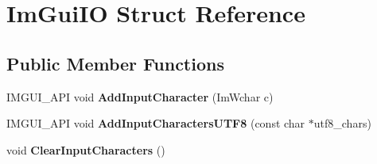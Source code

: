 \hypertarget{struct_im_gui_i_o}{}\section{Im\+Gui\+IO Struct Reference}
\label{struct_im_gui_i_o}
\subsection*{Public Member Functions}
\begin{DoxyCompactItemize}
\item 
\mbox{\label{struct_im_gui_i_o_a52b6bdef9278de5ae2031311a269cf14}} 
I\+M\+G\+U\+I\+\_\+\+A\+PI void {\bfseries Add\+Input\+Character} (Im\+Wchar c)
\item 
\mbox{\label{struct_im_gui_i_o_adaf150a1908c02c3cae15a35915bbb26}} 
I\+M\+G\+U\+I\+\_\+\+A\+PI void {\bfseries Add\+Input\+Characters\+U\+T\+F8} (const char $\ast$utf8\+\_\+chars)
\item 
\mbox{\label{struct_im_gui_i_o_a82d8794e14e628efbb026af4202c70ca}} 
void {\bfseries Clear\+Input\+Characters} ()
\end{DoxyCompactItemize}
